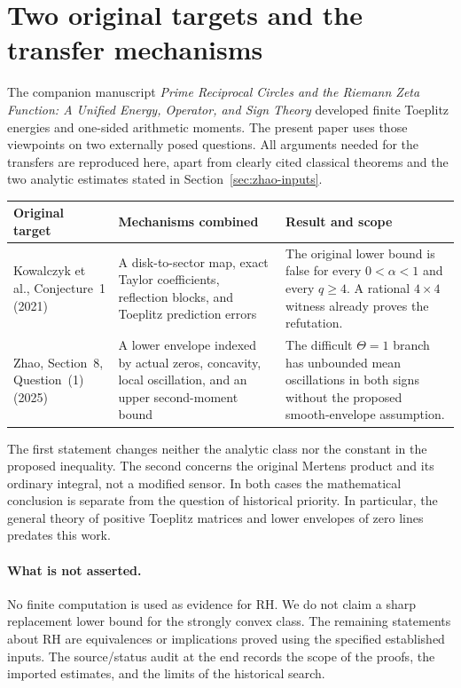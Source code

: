 \documentclass[11pt,a4paper]{article}
\numberwithin{equation}{section}
\theoremstyle{definition}\newtheorem{definition}[theorem]{Definition}
\theoremstyle{remark}\newtheorem{remark}[theorem]{Remark}
\begin{document}
\section{Two original targets and the transfer mechanisms}
\label{sec:scope}

The companion manuscript \emph{Prime Reciprocal Circles and the Riemann
Zeta Function: A Unified Energy, Operator, and Sign Theory} developed finite
Toeplitz energies and one-sided arithmetic moments. The present paper uses
those viewpoints on two externally posed questions. All arguments needed
for the transfers are reproduced here, apart from clearly cited classical
theorems and the two analytic estimates stated in Section~\ref{sec:zhao-inputs}.

\begin{center}\small
\begin{tabular}{@{}>{\raggedright\arraybackslash}p{}>{\raggedright\arraybackslash}p{}>{\raggedright\arraybackslash}p{}@{}}
\toprule
Original target & Mechanisms combined & Result and scope\\
\midrule
Kowalczyk et al., Conjecture~1 (2021)
& A disk-to-sector map, exact Taylor coefficients, reflection blocks,
and Toeplitz prediction errors
& The original lower bound is false for every $0<\alpha<1$ and every
$q\ge4$. A rational $4\times4$ witness already proves the refutation.\\[5pt]
Zhao, Section~8, Question~(1) (2025)
& A lower envelope indexed by actual zeros, concavity, local oscillation,
and an upper second-moment bound
& The difficult $\Theta=1$ branch has unbounded mean oscillations in both
signs without the proposed smooth-envelope assumption.\\
\bottomrule
\end{tabular}
\end{center}

The first statement changes neither the analytic class nor the constant in
the proposed inequality. The second concerns the original Mertens product
and its ordinary integral, not a modified sensor. In both cases the
mathematical conclusion is separate from the question of historical
priority. In particular, the general theory of positive Toeplitz matrices
and lower envelopes of zero lines predates this work.

\paragraph{What is not asserted.}
No finite computation is used as evidence for RH. We do not claim a sharp
replacement lower bound for the strongly convex class. The remaining
statements about RH are equivalences or implications proved using the
specified established inputs. The source/status audit at the end records the scope of the proofs,
the imported estimates, and the limits of the historical search.
\end{document}
